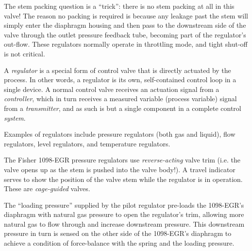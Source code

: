 





The stem packing question is a ``trick'': there is no stem packing at all in this valve!  The reason no packing is required is because any leakage past the stem will simply enter the diaphragm housing and then pass to the downstream side of the valve through the outlet pressure feedback tube, becoming part of the regulator's out-flow.  These regulators normally operate in throttling mode, and tight shut-off is not critical.







A {\it regulator} is a special form of control valve that is directly actuated by the process.  In other words, a regulator is its own, self-contained control loop in a single device.  A normal control valve receives an actuation signal from a {\it controller}, which in turn receives a measured variable (process variable) signal from a {\it transmitter}, and as such is but a single component in a complete control {\it system}.

Examples of regulators include pressure regulators (both gas and liquid), flow regulators, level regulators, and temperature regulators.

\vskip 10pt

The Fisher 1098-EGR pressure regulators use {\it reverse-acting} valve trim (i.e. the valve opens up as the stem is pushed into the valve body!).  A travel indicator serves to show the position of the valve stem while the regulator is in operation.  These are {\it cage-guided} valves.

\vskip 10pt

The ``loading pressure'' supplied by the pilot regulator pre-loads the 1098-EGR's diaphragm with natural gas pressure to open the regulator's trim, allowing more natural gas to flow through and increase downstream pressure.  This downstream pressure in turn is sensed on the other side of the 1098-EGR's diaphragm to achieve a condition of force-balance with the spring and the loading pressure.




